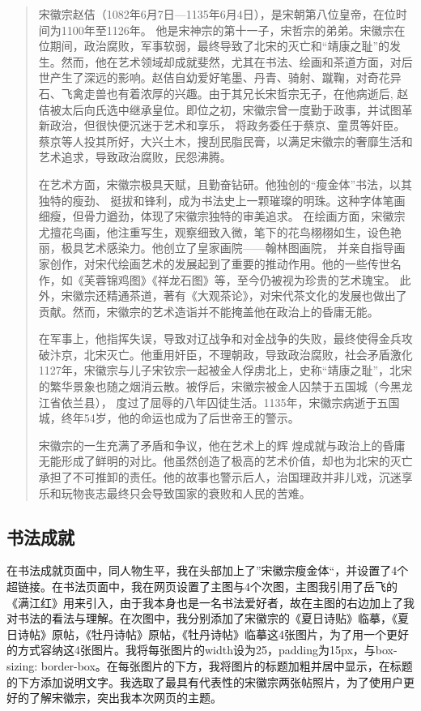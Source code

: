 \documentclass[supercite]{Experimental_Report}
\theoremstyle{definition}
\begin{document}
\begin{abstract}
    宋徽宗赵佶（1082年6月7日—1135年6月4日），是宋朝第八位皇帝，在位时间为1100年至1126年。
他是宋神宗的第十一子，宋哲宗的弟弟。宋徽宗在位期间，政治腐败，军事软弱，最终导致了北宋的灭亡和“靖康之耻”的发生。然而，他在艺术领域却成就斐然，尤其在书法、绘画和茶道方面，对后世产生了深远的影响。赵佶自幼爱好笔墨、丹青、骑射、蹴鞠，对奇花异石、飞禽走兽也有着浓厚的兴趣。由于其兄长宋哲宗无子，在他病逝后,
赵佶被太后向氏选中继承皇位。即位之初，宋徽宗曾一度勤于政事，并试图革新政治，但很快便沉迷于艺术和享乐，
将政务委任于蔡京、童贯等奸臣。蔡京等人投其所好，大兴土木，搜刮民脂民膏，以满足宋徽宗的奢靡生活和艺术追求，导致政治腐败，民怨沸腾。
\par 在艺术方面，宋徽宗极具天赋，且勤奋钻研。他独创的“瘦金体”书法，以其独特的瘦劲、
挺拔和锋利，成为书法史上一颗璀璨的明珠。这种字体笔画细瘦，但骨力遒劲，体现了宋徽宗独特的审美追求。
在绘画方面，宋徽宗尤擅花鸟画，他注重写生，观察细致入微，笔下的花鸟栩栩如生，设色艳丽，极具艺术感染力。他创立了皇家画院——翰林图画院，
并亲自指导画家创作，对宋代绘画艺术的发展起到了重要的推动作用。他的一些传世名作，如《芙蓉锦鸡图》《祥龙石图》等，至今仍被视为珍贵的艺术瑰宝。
此外，宋徽宗还精通茶道，著有《大观茶论》，对宋代茶文化的发展也做出了贡献。然而，宋徽宗的艺术造诣并不能掩盖他在政治上的昏庸无能。
\par 在军事上，他指挥失误，导致对辽战争和对金战争的失败，最终使得金兵攻破汴京，北宋灭亡。他重用奸臣，不理朝政，导致政治腐败，社会矛盾激化
1127年，宋徽宗与儿子宋钦宗一起被金人俘虏北上，史称“靖康之耻”，北宋的繁华景象也随之烟消云散。被俘后，宋徽宗被金人囚禁于五国城（今黑龙江省依兰县），
度过了屈辱的八年囚徒生活。1135年，宋徽宗病逝于五国城，终年54岁，他的命运也成为了后世帝王的警示。
\par 宋徽宗的一生充满了矛盾和争议，他在艺术上的辉
煌成就与政治上的昏庸无能形成了鲜明的对比。他虽然创造了极高的艺术价值，却也为北宋的灭亡承担了不可推卸的责任。他的故事也警示后人，治国理政并非儿戏，沉迷享乐和玩物丧志最终只会导致国家的衰败和人民的苦难。
\end{abstract}


\subsection{书法成就}

在书法成就页面中，同人物生平，我在头部加上了”宋徽宗瘦金体“，并设置了4个超链接。在书法页面中，我在网页设置了主图与4个次图，主图我引用了岳飞的《满江红》用来引入，由于我本身也是一名书法爱好者，故在主图的右边加上了我对书法的看法与理解。在次图中，我分别添加了宋徽宗的《夏日诗贴》临摹，《夏日诗帖》原帖，《牡丹诗帖》原帖，《牡丹诗帖》临摹这4张图片，为了用一个更好的方式容纳这4张图片。我将每张图片的width设为25，padding为15px，与box-sizing: border-box。在每张图片的下方，我将图片的标题加粗并居中显示，在标题的下方添加说明文字。我选取了最具有代表性的宋徽宗两张帖照片，为了使用户更好的了解宋徽宗，突出我本次网页的主题。
\end{document}
